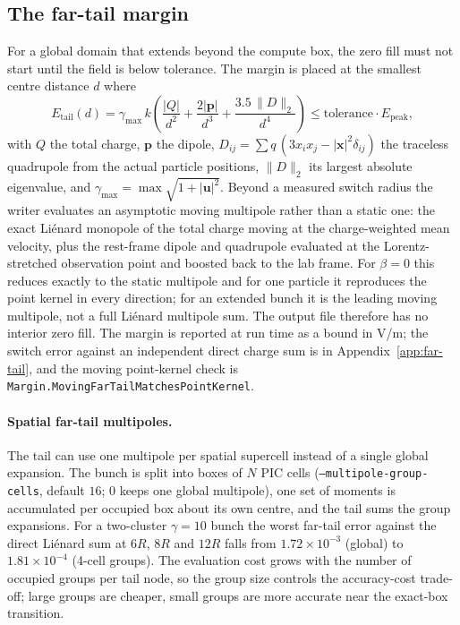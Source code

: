 \subsection{The far-tail margin}
\label{sec:margin}

For a global domain that extends beyond the compute box, the zero fill must
not start until the field is below tolerance. The margin is placed at the
smallest centre distance $d$ where
\begin{equation}
\label{eq:tail}
E_{\mathrm{tail}}(d)
= \gamma_{\max}\,k\left(
\frac{|Q|}{d^{2}} + \frac{2|\mathbf{p}|}{d^{3}}
+ \frac{3.5\,\lVert D\rVert_{2}}{d^{4}}\right)
\le \mathrm{tolerance}\cdot E_{\mathrm{peak}} ,
\end{equation}
with $Q$ the total charge, $\mathbf{p}$ the dipole,
$D_{ij}=\sum q\,(3x_i x_j - |\mathbf{x}|^{2}\delta_{ij})$ the traceless
quadrupole from the actual particle positions,
$\lVert D\rVert_{2}$ its largest absolute eigenvalue, and
$\gamma_{\max}=\max\sqrt{1+|\mathbf{u}|^{2}}$. Beyond a measured switch
radius the writer evaluates an asymptotic moving multipole rather than a
static one: the exact Li\'enard monopole of the total charge moving at the
charge-weighted mean velocity, plus the rest-frame dipole and quadrupole
evaluated at the Lorentz-stretched observation point and boosted back to the
lab frame. For $\beta=0$ this reduces exactly to
the static multipole and for one particle it reproduces the point kernel in
every direction; for an extended bunch it is the leading moving multipole,
not a full Li\'enard multipole sum. The output file therefore has no
interior zero fill. The margin is reported at run time as a bound in V/m;
the switch error against an independent direct charge sum is in
Appendix~\ref{app:far-tail}, and the moving point-kernel check is
\texttt{Margin.MovingFarTailMatchesPointKernel}.

\paragraph{Spatial far-tail multipoles.}
The tail can use one multipole per spatial supercell instead of a single
global expansion.  The bunch is split into boxes of $N$ PIC cells
(\texttt{--multipole-group-cells}, default $16$; $0$ keeps one global
multipole), one set of moments is accumulated per occupied box about its own
centre, and the tail sums the group expansions.  For a two-cluster
$\gamma=10$ bunch the worst far-tail error against the direct Li\'enard sum at
$6R$, $8R$ and $12R$ falls from $1.72\times10^{-3}$ (global) to
$1.81\times10^{-4}$ (4-cell groups).  The evaluation cost grows with the number
of occupied groups per tail node, so the group size controls the accuracy-cost
trade-off; large groups are cheaper, small groups are more accurate near the
exact-box transition.

